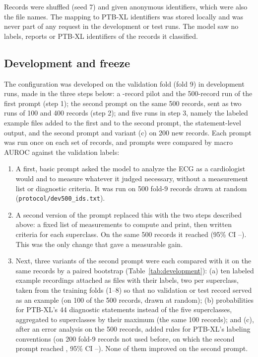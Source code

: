Records were shuffled (seed 7) and given anonymous identifiers, which were also the file names.
The mapping to PTB-XL identifiers was stored locally and was never part of any request in the development or test
runs. The model saw no labels, reports or PTB-XL identifiers of the records it classified.

\subsection{Development and freeze}\label{sec:development}
The configuration was developed on the validation fold (fold 9) in \NDevRuns{} development runs, made in the three
steps below: a \NPilot-record pilot and the 500-record run of the first prompt (step 1); the second prompt on the
same 500 records, sent as two runs of 100 and 400 records (step 2); and five runs in step 3, namely the labeled
example files added to the first and to the second prompt, the statement-level output, and the second prompt and
variant (c) on 200 new records. Each prompt was run once on each set of records, and prompts were compared by macro AUROC against the validation labels:
\begin{enumerate}
  \setlength{\itemsep}{0pt}\setlength{\parsep}{0pt}
  \item A first, basic prompt asked the model to analyze the ECG as a cardiologist would and to measure whatever it
  judged necessary, without a measurement list or diagnostic criteria. It was run on 500 fold-9 records drawn at
  random (\texttt{protocol/dev500\_ids.txt}).
  \item A second version of the prompt replaced this with the two steps described above: a fixed list of measurements to compute
  and print, then written criteria for each superclass. On the same 500 records it reached \DevVTwo{} (95\% CI
  \DevVTwoLow--\DevVTwoHigh). This was the only change that gave a measurable gain.
  \item Next, three variants of the second prompt were each compared with it on the same records by a paired bootstrap
  (Table~\ref{tab:development}): (a) ten labeled example recordings attached as files with their labels, two per
  superclass, taken from the training folds (1--8) so that no validation or test record served as an example (on 100
  of the 500 records, drawn at random); (b) probabilities for PTB-XL's 44 diagnostic statements instead of the five
  superclasses, aggregated to superclasses by their maximum (the same 100 records); and (c), after an error analysis
  on the 500 records, added rules for PTB-XL's labeling conventions (on 200 fold-9 records not used before, on which
  the second prompt reached \DevFreshVTwo, 95\% CI \DevFreshVTwoLow--\DevFreshVTwoHigh). None of them improved on the
  second prompt.
\end{enumerate}
